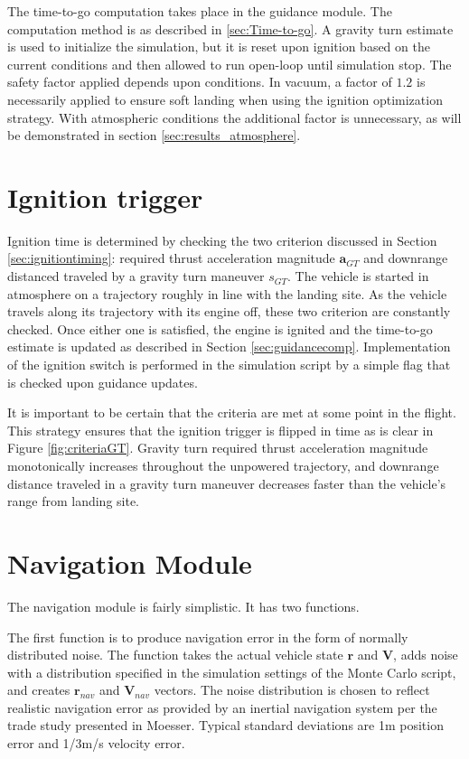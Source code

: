 The time-to-go computation takes place in the guidance module. The computation method is as described in \ref{sec:Time-to-go}. A gravity turn estimate is used to initialize the simulation, but it is reset upon ignition based on the current conditions and then allowed to run open-loop until simulation stop. The safety factor applied depends upon conditions. In vacuum, a factor of $1.2$ is necessarily applied to ensure soft landing when using the ignition optimization strategy. With atmospheric conditions the additional factor is unnecessary, as will be demonstrated in section \ref{sec:results_atmosphere}.

\section{Ignition trigger}
Ignition time is determined by checking the two criterion discussed in Section \ref{sec:ignitiontiming}: required thrust acceleration magnitude $\bm{a}_{GT}$ and downrange distanced traveled by a gravity turn maneuver $s_{GT}$. The vehicle is started in atmosphere on a trajectory roughly in line with the landing site. As the vehicle travels along its trajectory with its engine off, these two criterion are constantly checked. Once either one is satisfied, the engine is ignited and the time-to-go estimate is updated as described in Section \ref{sec:guidancecomp}. Implementation of the ignition switch is performed in the simulation script by a simple flag that is checked upon guidance updates.

It is important to be certain that the criteria are met at some point in the flight. This strategy ensures that the ignition trigger is flipped in time as is clear in Figure \ref{fig:criteriaGT}. Gravity turn required thrust acceleration magnitude monotonically increases throughout the unpowered trajectory, and downrange distance traveled in a gravity turn maneuver decreases faster than the vehicle's range from landing site.

\section{Navigation Module} \label{sec:navmod}
The navigation module is fairly simplistic. It has two functions. 

The first function is to produce navigation error in the form of normally distributed noise. The function takes the actual vehicle state $\bm{r}$ and $\bm{V}$, adds noise with a distribution specified in the simulation settings of the Monte Carlo script, and creates $\bm{r}_{nav}$ and $\bm{V}_{nav}$ vectors. The noise distribution is chosen to reflect realistic navigation error as provided by an inertial navigation system per the trade study presented in Moesser\:\cite{MOESSER}. Typical standard deviations are 1\:m position error and 1/3\:m/s velocity error.

